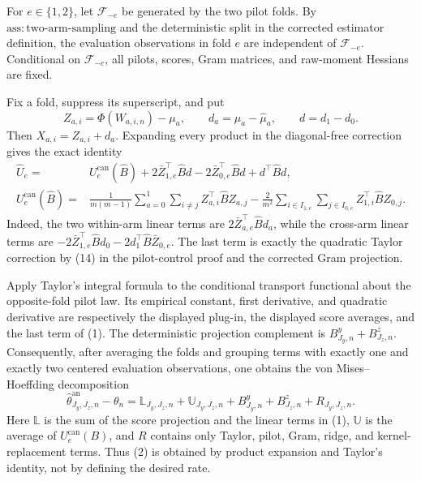 For \(e\in\{1,2\}\), let \(\mathscr F_{-e}\) be generated by the two pilot folds.  By \(\mathrm{ass{:}two\text{-}arm\text{-}sampling}\) and the deterministic split in the corrected estimator definition, the evaluation observations in fold \(e\) are independent of \(\mathscr F_{-e}\).  Conditional on \(\mathscr F_{-e}\), all pilots, scores, Gram matrices, and raw-moment Hessians are fixed.

Fix a fold, suppress its superscript, and put
\[
Z_{a,i}=\Phi(W_{a,i,n})-\mu_a,
\qquad d_a=\mu_a-\widehat\mu_a,
\qquad d=d_1-d_0.
\]
Then \(X_{a,i}=Z_{a,i}+d_a\).  Expanding every product in the diagonal-free correction gives the exact identity
\[
\begin{split}
\widehat U_e={}&U_e^{\mathrm{can}}(\widehat B)
+2\bar Z_{1,e}^{\top}\widehat Bd-2\bar Z_{0,e}^{\top}\widehat Bd
+d^{\top}\widehat Bd,\\
U_e^{\mathrm{can}}(\widehat B)={}&
\frac1{m(m-1)}\sum_{a=0}^1\sum_{i\ne j}Z_{a,i}^{\top}\widehat BZ_{a,j}
-\frac2{m^2}\sum_{i\in I_{1,e}}\sum_{j\in I_{0,e}}Z_{1,i}^{\top}\widehat BZ_{0,j}.
\end{split}\tag{1}
\]
Indeed, the two within-arm linear terms are \(2\bar Z_{a,e}^{\top}\widehat Bd_a\), while the cross-arm linear terms are \(-2\bar Z_{1,e}^{\top}\widehat Bd_0-2d_1^{\top}\widehat B\bar Z_{0,e}\).  The last term is exactly the quadratic Taylor correction by (14) in the pilot-control proof and the corrected Gram projection.

Apply Taylor's integral formula to the conditional transport functional about the opposite-fold pilot law.  Its empirical constant, first derivative, and quadratic derivative are respectively the displayed plug-in, the displayed score averages, and the last term of (1).  The deterministic projection complement is \(B^y_{J_y,n}+B^z_{J_z,n}\).  Consequently, after averaging the folds and grouping terms with exactly one and exactly two centered evaluation observations, one obtains the von Mises--Hoeffding decomposition
\[
\widehat\theta^{\mathrm{an}}_{J_y,J_z,n}-\theta_n
=\mathbb L_{J_y,J_z,n}+\mathbb U_{J_y,J_z,n}
+B^y_{J_y,n}+B^z_{J_z,n}+R_{J_y,J_z,n}.                                  \tag{2}
\]
Here \(\mathbb L\) is the sum of the score projection and the linear terms in (1), \(\mathbb U\) is the average of \(U_e^{\mathrm{can}}(B)\), and \(R\) contains only Taylor, pilot, Gram, ridge, and kernel-replacement terms.  Thus (2) is obtained by product expansion and Taylor's identity, not by defining the desired rate.

